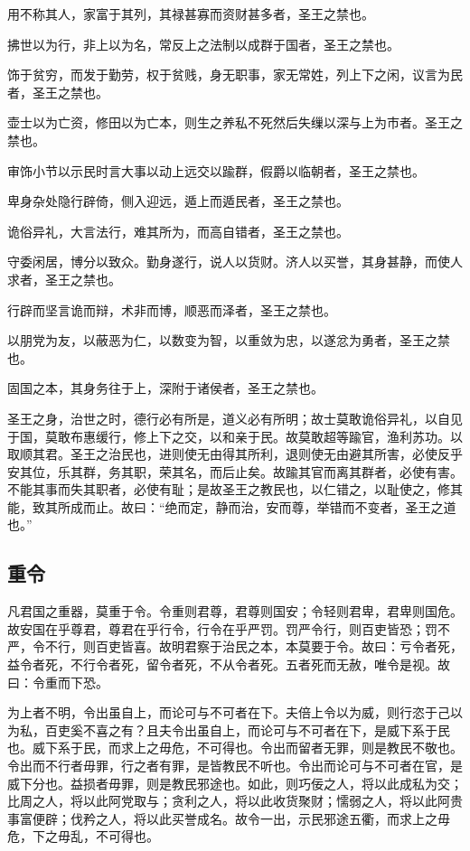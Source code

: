 \documentclass[]{article}
\begin{document}
用不称其人，家富于其列，其禄甚寡而资财甚多者，圣王之禁也。

拂世以为行，非上以为名，常反上之法制以成群于国者，圣王之禁也。

饰于贫穷，而发于勤劳，权于贫贱，身无职事，家无常姓，列上下之闲，议言为民者，圣王之禁也。

壶士以为亡资，修田以为亡本，则生之养私不死然后失缫以深与上为市者。圣王之禁也。

审饰小节以示民时言大事以动上远交以踰群，假爵以临朝者，圣王之禁也。

卑身杂处隐行辟倚，侧入迎远，遁上而遁民者，圣王之禁也。

诡俗异礼，大言法行，难其所为，而高自错者，圣王之禁也。

守委闲居，博分以致众。勤身遂行，说人以货财。济人以买誉，其身甚静，而使人求者，圣王之禁也。

行辟而坚言诡而辩，术非而博，顺恶而泽者，圣王之禁也。

以朋党为友，以蔽恶为仁，以数变为智，以重敛为忠，以遂忿为勇者，圣王之禁也。

固国之本，其身务往于上，深附于诸侯者，圣王之禁也。

圣王之身，治世之时，德行必有所是，道义必有所明；故士莫敢诡俗异礼，以自见于国，莫敢布惠缓行，修上下之交，以和亲于民。故莫敢超等踰官，渔利苏功。以取顺其君。圣王之治民也，进则使无由得其所利，退则使无由避其所害，必使反乎安其位，乐其群，务其职，荣其名，而后止矣。故踰其官而离其群者，必使有害。不能其事而失其职者，必使有耻；是故圣王之教民也，以仁错之，以耻使之，修其能，致其所成而止。故曰：``绝而定，静而治，安而尊，举错而不变者，圣王之道也。''

\hypertarget{header-n272}{%
\subsection{重令 }\label{header-n272}}

凡君国之重器，莫重于令。令重则君尊，君尊则国安；令轻则君卑，君卑则国危。故安国在乎尊君，尊君在乎行令，行令在乎严罚。罚严令行，则百吏皆恐；罚不严，令不行，则百吏皆喜。故明君察于治民之本，本莫要于令。故曰：亏令者死，益令者死，不行令者死，留令者死，不从令者死。五者死而无赦，唯令是视。故曰：令重而下恐。

为上者不明，令出虽自上，而论可与不可者在下。夫倍上令以为威，则行恣于己以为私，百吏奚不喜之有？且夫令出虽自上，而论可与不可者在下，是威下系于民也。威下系于民，而求上之毋危，不可得也。令出而留者无罪，则是教民不敬也。令出而不行者毋罪，行之者有罪，是皆教民不听也。令出而论可与不可者在官，是威下分也。益损者毋罪，则是教民邪途也。如此，则巧佞之人，将以此成私为交；比周之人，将以此阿党取与；贪利之人，将以此收货聚财；懦弱之人，将以此阿贵事富便辟；伐矜之人，将以此买誉成名。故令一出，示民邪途五衢，而求上之毋危，下之毋乱，不可得也。
\end{document}
